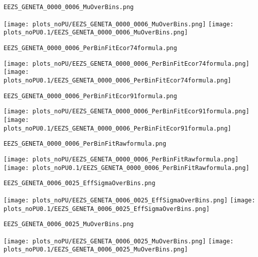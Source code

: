 \begin{frame}[fragile]
\begin{verbatim}
EEZS_GENETA_0000_0006_MuOverBins.png
\end{verbatim}
\texttt{[image: plots\_noPU/EEZS\_GENETA\_0000\_0006\_MuOverBins.png]}
\texttt{[image: plots\_noPU0.1/EEZS\_GENETA\_0000\_0006\_MuOverBins.png]}
\end{frame}
\begin{frame}[fragile]
\begin{verbatim}
EEZS_GENETA_0000_0006_PerBinFitEcor74formula.png
\end{verbatim}
\texttt{[image: plots\_noPU/EEZS\_GENETA\_0000\_0006\_PerBinFitEcor74formula.png]}
\texttt{[image: plots\_noPU0.1/EEZS\_GENETA\_0000\_0006\_PerBinFitEcor74formula.png]}
\end{frame}
\begin{frame}[fragile]
\begin{verbatim}
EEZS_GENETA_0000_0006_PerBinFitEcor91formula.png
\end{verbatim}
\texttt{[image: plots\_noPU/EEZS\_GENETA\_0000\_0006\_PerBinFitEcor91formula.png]}
\texttt{[image: plots\_noPU0.1/EEZS\_GENETA\_0000\_0006\_PerBinFitEcor91formula.png]}
\end{frame}
\begin{frame}[fragile]
\begin{verbatim}
EEZS_GENETA_0000_0006_PerBinFitRawformula.png
\end{verbatim}
\texttt{[image: plots\_noPU/EEZS\_GENETA\_0000\_0006\_PerBinFitRawformula.png]}
\texttt{[image: plots\_noPU0.1/EEZS\_GENETA\_0000\_0006\_PerBinFitRawformula.png]}
\end{frame}
\begin{frame}[fragile]
\begin{verbatim}
EEZS_GENETA_0006_0025_EffSigmaOverBins.png
\end{verbatim}
\texttt{[image: plots\_noPU/EEZS\_GENETA\_0006\_0025\_EffSigmaOverBins.png]}
\texttt{[image: plots\_noPU0.1/EEZS\_GENETA\_0006\_0025\_EffSigmaOverBins.png]}
\end{frame}
\begin{frame}[fragile]
\begin{verbatim}
EEZS_GENETA_0006_0025_MuOverBins.png
\end{verbatim}
\texttt{[image: plots\_noPU/EEZS\_GENETA\_0006\_0025\_MuOverBins.png]}
\texttt{[image: plots\_noPU0.1/EEZS\_GENETA\_0006\_0025\_MuOverBins.png]}
\end{frame}
